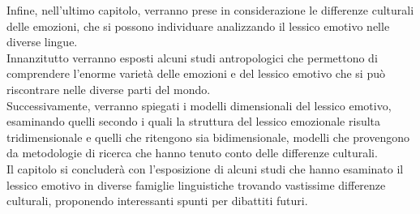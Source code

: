 Infine, nell'ultimo capitolo, verranno prese in considerazione le differenze culturali delle emozioni, che si possono individuare analizzando il lessico emotivo nelle diverse lingue. \\
Innanzitutto verranno esposti alcuni studi antropologici che permettono di comprendere l'enorme varietà delle emozioni e del lessico emotivo che si può riscontrare nelle diverse parti del mondo. \\
Successivamente, verranno spiegati i modelli dimensionali del lessico emotivo, esaminando quelli secondo i quali la struttura del lessico emozionale risulta tridimensionale e quelli che ritengono sia bidimensionale, modelli che provengono da metodologie di ricerca che hanno tenuto conto delle differenze culturali. \\
Il capitolo si concluderà con l'esposizione di alcuni studi che hanno esaminato il lessico emotivo in diverse famiglie linguistiche trovando vastissime differenze culturali, proponendo interessanti spunti per dibattiti futuri. 


